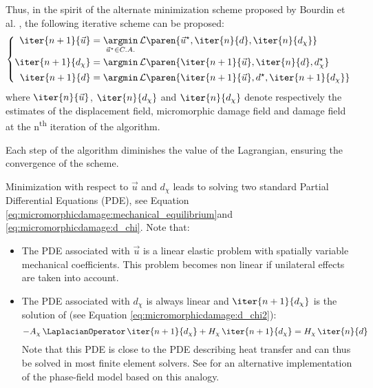 Thus, in the spirit of the alternate minimization scheme proposed by
Bourdin et al. \cite{bourdin_numerical_2000}, the following iterative scheme
can be proposed:
%
%
%
\begin{equation}
  \left\{
  \begin{aligned}
  \iter{n+1}{\vec{u}} &= \underset{\vec{u}^{\star}\in C.A.}{\argmin}\, \mathcal{L}\paren{\vec{u}^{\star},\iter{n}{d},\iter{n}{d_{\chi}}}\\
  \iter{n+1}{d_{\chi}} &= \argmin \,\mathcal{L}\paren{\iter{n+1}{\vec{u}},\iter{n}{d},d_{\chi}^{\star}} \\
  \iter{n+1}{d} &= \argmin \,\mathcal{L}\paren{\iter{n+1}{\vec{u}},d^{\star},\iter{n+1}{d_{\chi}}} \\
  \end{aligned}
  \right.
\end{equation}
where $\iter{n}{\vec{u}}$, $\iter{n}{d_{\chi}}$ and
$\iter{n}{d_{\chi}}$ denote respectively the estimates of the
displacement field, micromorphic damage field and damage field at the
n\textsuperscript{th} iteration of the algorithm.

Each step of the algorithm diminishes the value of the Lagrangian,
ensuring the convergence of the scheme.

Minimization with respect to $\vec{u}$ and $d_{\chi}$ leads to
solving two standard Partial Differential Equations (PDE), see Equation
\eqref{eq:micromorphicdamage:mechanical_equilibrium}and
\eqref{eq:micromorphicdamage:d_chi}. Note that:
%
%
%
\begin{itemize}
  \item The PDE associated with $\vec{u}$ is a linear elastic problem with
  spatially variable mechanical coefficients. This problem becomes non
  linear if unilateral effects are taken into account.
  \item The PDE associated with $d_{\chi}$ is always linear and
  $\iter{n+1}{d_{\chi}}$ is the solution of (see Equation
  \eqref{eq:micromorphicdamage:d_chi2}):
  \[
  -A_{\chi}\,\LaplacianOperator\,\iter{n+1}{d_{\chi}}+H_{\chi}\,\iter{n+1}{d_{\chi}}=
  H_{\chi}\,\iter{n}{d}
  \]
  Note that this PDE is close to the PDE describing heat transfer and can
  thus be solved in most finite element solvers. See \cite{azinpour_simple_2018}
  for an alternative implementation of the phase-field model based on this analogy.
\end{itemize}

